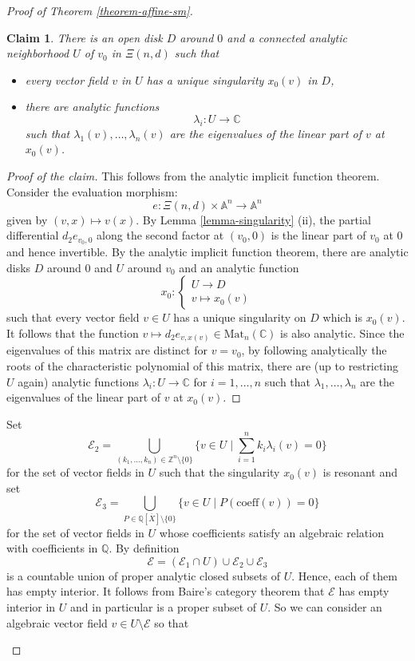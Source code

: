 \documentclass[12pt]{amsart}
\theoremstyle{definition}
\theoremstyle{plain}
\newtheorem{claim}{Claim}
\theoremstyle{exampstyle}
\theoremstyle{exampstyle}\newtheorem{thmxbis}{Theorem}
\numberwithin{equation}{section}
\theoremstyle{remark}
\begin{document}
\begin{proof}[Proof of Theorem \ref{theorem-affine-sm}]
\begin{claim} 
There is an open disk $D$ around $0$ and a connected analytic neighborhood $U$ of $v_0$ in $\Xi(n,d)$ such that 
\begin{itemize} 
\item every vector field $v$ in $U$ has a unique singularity $ x_0(v)$ in $D$, 
\item there are analytic functions 
$$\lambda_i: U \rightarrow \mathbb{C}$$ 
such that $\lambda_1(v),\ldots, \lambda_n(v)$ are the eigenvalues of the linear part of $v$ at $x_0(v)$. 
\end{itemize} 
\end{claim} 

\begin{proof}[Proof of the claim] 
This follows from the analytic implicit function theorem. Consider the evaluation morphism:
$$e : \Xi(n,d) \times \mathbb{A}^n \rightarrow \mathbb{A}^n$$
given by $(v,x) \mapsto v(x)$. By Lemma \ref{lemma-singularity} (ii), the partial differential $d_2e_{v_0,0}$ along the second factor at $(v_0,0)$ is the linear part of $v_0$ at $0$ and hence invertible. By the analytic implicit function theorem, there are analytic disks $D$ around $0$ and $U$ around $v_0$ and an analytic function 
$$x_0 : \begin{cases} U \rightarrow D \\ v \mapsto x_0(v) 
\end{cases}$$
such that every vector field $v \in U$ has a unique singularity on $D$ which is $x_0(v)$. It follows that the function $v  \mapsto d_2e_{v,x(v)} \in \mathrm{Mat}_n(\mathbb{C})$ is also analytic. Since the eigenvalues of this matrix are distinct for $v = v_0$, by following analytically the roots of the characteristic polynomial of this matrix, there are (up to restricting $U$ again) analytic functions $\lambda_i: U \rightarrow \mathbb{C}$ for $i = 1,\ldots, n$ 
such that $\lambda_1,\ldots, \lambda_n$ are the eigenvalues of the linear part of $v$ at $x_0(v)$. 
\end{proof}

Set $$ \mathcal E_2 = \bigcup_{(k_1,\ldots, k_n) \in \mathbb{Z}^n \setminus \lbrace 0 \rbrace} \Big\{ v \in U \mid \sum_{i = 1}^n k_i \lambda_i(v) = 0 \Big\} $$  
for the set of vector fields in $U$ such that the singularity $x_0(v)$ is resonant and set $$ \mathcal E_3 = \bigcup_{P \in \mathbb{Q}[\overline{X}] \setminus \lbrace 0 \rbrace}\Big\{ v \in U \mid P(\mathrm{coeff}(v)) = 0 \Big\} $$ 
for the set of vector fields in $U$ whose coefficients satisfy an algebraic relation with coefficients in $\mathbb{Q}$. By definition 
$$\mathcal E = (\mathcal E_1 \cap U) \cup \mathcal E_2 \cup \mathcal E_3$$
is a countable union of proper analytic closed subsets of $U$. Hence, each of them has empty interior. It follows from Baire's category theorem that  $ \mathcal E$ has empty interior in $U$ and in particular is  a proper subset of $U$. So we can consider an algebraic vector field $v \in U \setminus \mathcal E$ so that
\begin{itemize} 


\end{itemize}
\end{proof}
\end{document}
